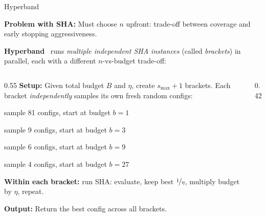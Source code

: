 \begin{frame}{Hyperband}

  \textbf{Problem with SHA:} Must choose $n$ upfront: trade-off between coverage and early stopping aggressiveness.

  \vspace{0.3em}
  \textbf{Hyperband}~\cite{li2017hyperband} runs \emph{multiple independent SHA instances} (called \emph{brackets}) in parallel, each with a different $n$-vs-budget trade-off:

  \vspace{0.2em}
  \begin{columns}[T]
    \begin{column}{0.55\textwidth}
      \textbf{Setup:} Given total budget $B$ and $\eta$, create $s_{\max}{+}1$ brackets.
      Each bracket \emph{independently} samples its own fresh random configs:
      \begin{description}[leftmargin=0.5em]
        \item[Brk 0:] sample 81 configs, start at budget $b{=}1$
        \item[Brk 1:] sample 9 configs, start at budget $b{=}3$
        \item[Brk 2:] sample 6 configs, start at budget $b{=}9$
        \item[Brk 3:] sample 4 configs, start at budget $b{=}27$
      \end{description}
      \vspace{0.2em}
      \textbf{Within each bracket:} run SHA: evaluate, keep best $\nicefrac{1}{\eta}$, multiply budget by $\eta$, repeat.

      \vspace{0.2em}
      \textbf{Output:} Return the best config across all brackets.
    \end{column}
    \begin{column}{0.42\textwidth}
      \begin{center}
\end{center}
\end{column}
\end{columns}
\end{frame}
